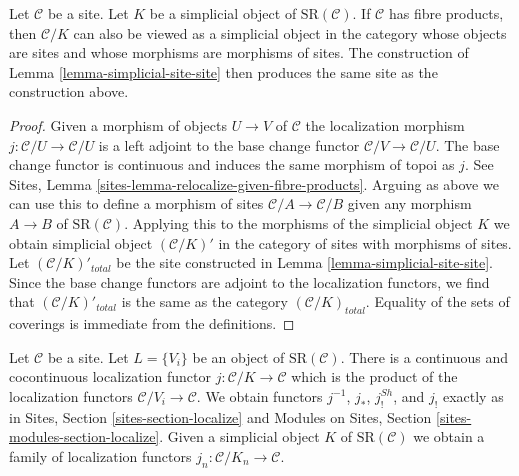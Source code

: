 \begin{lemma}
\label{lemma-sr-when-fibre-products}
Let $\mathcal{C}$ be a site. Let $K$ be a simplicial object of
$\text{SR}(\mathcal{C})$. If $\mathcal{C}$ has fibre products,
then $\mathcal{C}/K$ can also be viewed as a simplicial object
in the category whose objects are sites and whose morphisms are
morphisms of sites. The construction of
Lemma \ref{lemma-simplicial-site-site}
then produces the same site as the construction above.
\end{lemma}

\begin{proof}
Given a morphism of objects $U \to V$ of $\mathcal{C}$ the localization
morphism $j : \mathcal{C}/U \to \mathcal{C}/U$ is a left adjoint to
the base change functor $\mathcal{C}/V \to \mathcal{C}/U$.
The base change functor is continuous and induces the same morphism of
topoi as $j$. See
Sites, Lemma \ref{sites-lemma-relocalize-given-fibre-products}.
Arguing as above we can use this to define a morphism of sites
$\mathcal{C}/A \to \mathcal{C}/B$ given any morphism $A \to B$
of $\text{SR}(\mathcal{C})$. Applying this to the morphisms of
the simplicial object $K$ we obtain simplicial object
$(\mathcal{C}/K)'$ in the category of sites with morphisms of sites.
Let $(\mathcal{C}/K)'_{total}$ be the site constructed in
Lemma \ref{lemma-simplicial-site-site}.
Since the base change functors are adjoint to the localization
functors, we find that $(\mathcal{C}/K)'_{total}$ is the same
as the category $(\mathcal{C}/K)_{total}$. Equality of the
sets of coverings is immediate from the definitions.
\end{proof}

\noindent
Let $\mathcal{C}$ be a site. Let $L = \{V_i\}$ be an object of
$\text{SR}(\mathcal{C})$. There is a continuous and cocontinuous
localization functor $j : \mathcal{C}/K \to \mathcal{C}$ which is
the product of the localization functors $\mathcal{C}/V_i \to \mathcal{C}$.
We obtain functors $j^{-1}$, $j_*$, $j^{Sh}_!$, and $j_!$ exactly
as in Sites, Section \ref{sites-section-localize} and
Modules on Sites, Section \ref{sites-modules-section-localize}.
Given a simplicial
object $K$ of $\text{SR}(\mathcal{C})$ we obtain a family
of localization functors $j_n : \mathcal{C}/K_n \to \mathcal{C}$.

